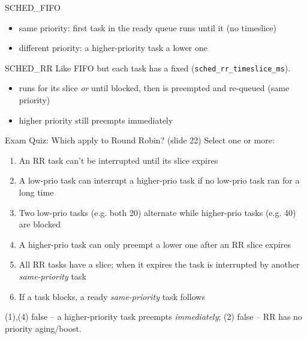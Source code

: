 
\begin{definition}{SCHED\_FIFO}
    \begin{itemize}
        \item same priority: first task in the ready queue runs until it
               (no timeslice)
        \item different priority: a higher-priority task  a lower one
    \end{itemize}
\end{definition}

\begin{definition}{SCHED\_RR}
    Like FIFO but each task has a fixed 
    (\texttt{sched\_rr\_timeslice\_ms}).
    \begin{itemize}
        \item runs for its slice \emph{or} until blocked, then is preempted and
              re-queued (same priority)
        \item higher priority still preempts immediately
    \end{itemize}
\end{definition}

\multend

\begin{example2}{Exam Quiz: Which apply to Round Robin? (slide 22)}
    Select one or more:
    \begin{enumerate}
        \item An RR task can't be interrupted until its slice expires
        \item A low-prio task can interrupt a higher-prio task if no low-prio task
              ran for a long time
        \item Two low-prio tasks (e.g. both 20) alternate while higher-prio tasks
              (e.g. 40) are blocked
        \item A higher-prio task can only preempt a lower one after an RR slice expires
        \item All RR tasks have a slice; when it expires the task is interrupted by
              another \emph{same-priority} task
        \item If a task blocks, a ready \emph{same-priority} task follows
    \end{enumerate}
    \tcblower
    (1),(4) false -- a higher-priority task preempts \emph{immediately}; (2) false --
    RR has no priority aging/boost.
\end{example2}

